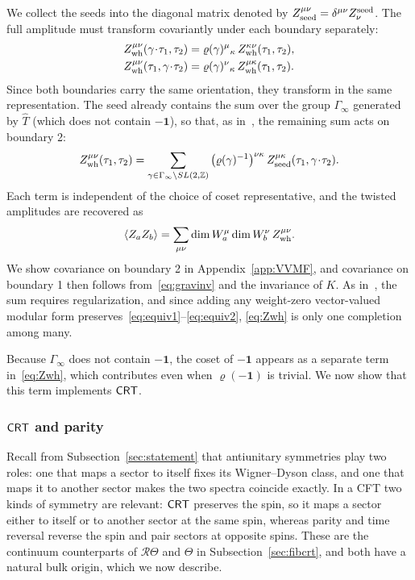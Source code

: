 \documentclass[11pt]{article}
\numberwithin{equation}{section}
\newcommand{\Zwh}{Z_{\rm wh}}
\newcommand{\vr}{\varrho}
\begin{document}
We collect the seeds into the diagonal matrix denoted by $Z^{\mu\nu}_{\rm seed}=\delta^{\mu\nu}Z^{\rm seed}_\nu$. The full amplitude must transform covariantly under each boundary separately:
\begin{align}
\Zwh^{\mu\nu}(\gamma\!\cdot\!\tau_1,\tau_2)&=\vr(\gamma)^{\mu}{}_{\kappa}\,\Zwh^{\kappa\nu}(\tau_1,\tau_2),\label{eq:equiv1}\\
\Zwh^{\mu\nu}(\tau_1,\gamma\!\cdot\!\tau_2)&=\vr(\gamma)^{\nu}{}_{\kappa}\,\Zwh^{\mu\kappa}(\tau_1,\tau_2).\label{eq:equiv2}
\end{align}
Since both boundaries carry the same orientation, they transform in the same representation. The seed already contains the sum over the group $\Gamma_\infty$ generated by $\hat T$ (which does not contain $-\mathbf 1$), so that, as in~\cite{Cotler:2020ugk}, the remaining sum acts on boundary 2:
\begin{equation}\label{eq:Zwh}
\Zwh^{\mu\nu}(\tau_1,\tau_2)=\sum_{\gamma\in\Gamma_\infty\backslash SL(2,\Z)}\big(\vr(\gamma)^{-1}\big)^{\nu\kappa}\,Z^{\mu\kappa}_{\rm seed}(\tau_1,\gamma\!\cdot\!\tau_2).
\end{equation}
Each term is independent of the choice of coset representative, and the twisted amplitudes are recovered as
\begin{align}
    \langle Z_aZ_b\rangle=\sum_{\mu\nu}\dim W_a^\mu\dim W_b^\nu\,\Zwh^{\mu\nu}.
\end{align}
 We show covariance on boundary 2 in Appendix~\ref{app:VVMF}, and covariance on boundary 1 then follows from~\eqref{eq:gravinv} and the invariance of $K$. As in~\cite{Cotler:2020ugk}, the sum requires regularization, and since adding any weight-zero vector-valued modular form preserves~\eqref{eq:equiv1}--\eqref{eq:equiv2}, \eqref{eq:Zwh} is only one completion among many.

Because $\Gamma_\infty$ does not contain $-\mathbf 1$, the coset of $-\mathbf 1$ appears as a separate term in~\eqref{eq:Zwh}, which contributes even when $\vr(-\mathbf 1)$ is trivial. We now show that this term implements $\mathsf{CRT}$.

\subsubsection{$\mathsf{CRT}$ and parity}\label{sec:crt}

Recall from Subsection~\ref{sec:statement} that antiunitary symmetries play two roles: one that maps a sector to itself fixes its Wigner--Dyson class, and one that maps it to another sector makes the two spectra coincide exactly. In a CFT two kinds of symmetry are relevant: $\mathsf{CRT}$ preserves the spin, so it maps a sector either to itself or to another sector at the same spin, whereas parity and time reversal reverse the spin and pair sectors at opposite spins. These are the continuum counterparts of $\mathcal R\Theta$ and $\Theta$ in Subsection~\ref{sec:fibcrt}, and both have a natural bulk origin, which we now describe.
\end{document}
